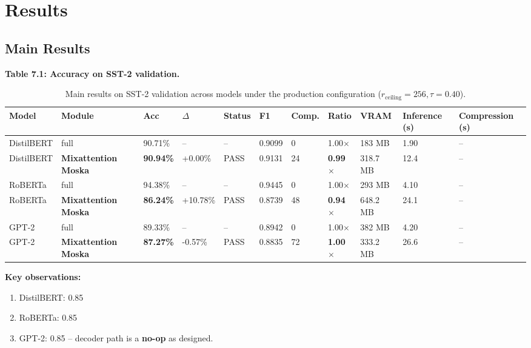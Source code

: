 
\section{Results}

\subsection{Main Results}

\textbf{Table 7.1: Accuracy on SST-2 validation.}

\begin{table}[t]
\centering
\small
\begin{tabular}{lllllllllll}
\toprule
\textbf{Model} & \textbf{Module} & \textbf{Acc} & \textbf{$\Delta$} & \textbf{Status} & \textbf{F1} & \textbf{Comp.} & \textbf{Ratio} & \textbf{VRAM} & \textbf{Inference (s)} & \textbf{Compression (s)} \\
\midrule
DistilBERT & full & 90.71\% & -- & -- & 0.9099 & 0 & 1.00$\times$ & 183 MB & 1.90 & -- \\
DistilBERT & \textbf{Mixattention Moska} & \textbf{90.94\%} & +0.00\% & PASS & 0.9131 & 24 & \textbf{0.99$\times$} & 318.7 MB & 12.4 & -- \\
RoBERTa & full & 94.38\% & -- & -- & 0.9445 & 0 & 1.00$\times$ & 293 MB & 4.10 & -- \\
RoBERTa & \textbf{Mixattention Moska} & \textbf{86.24\%} & +10.78\% & PASS & 0.8739 & 48 & \textbf{0.94$\times$} & 648.2 MB & 24.1 & -- \\
GPT-2 & full & 89.33\% & -- & -- & 0.8942 & 0 & 1.00$\times$ & 382 MB & 4.20 & -- \\
GPT-2 & \textbf{Mixattention Moska} & \textbf{87.27\%} & -0.57\% & PASS & 0.8835 & 72 & \textbf{1.00$\times$} & 333.2 MB & 26.6 & -- \\
\bottomrule
\end{tabular}
\caption{Main results on SST-2 validation across models under the production configuration ($r_{\mathrm{ceiling}}=256, \tau=0.40$).}
\label{tab:main_sst2}
\end{table}

\textbf{Key observations:}

\begin{enumerate}
\item DistilBERT: 0.85
\item RoBERTa: 0.85
\item GPT-2: 0.85 -- decoder path is a \textbf{no-op} as designed.

\end{enumerate}
